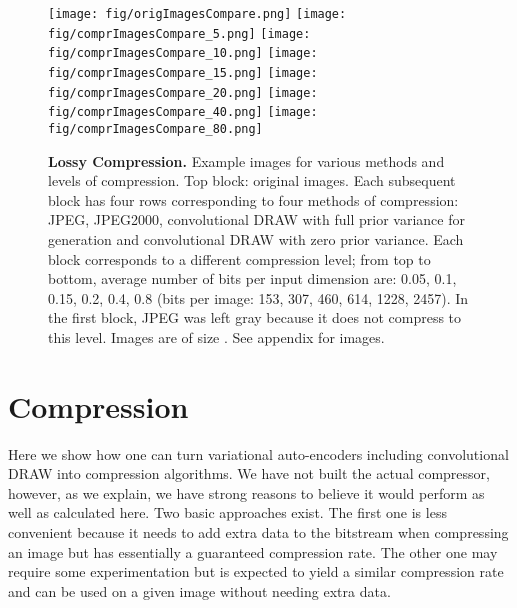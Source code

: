 \documentclass{article}
\begin{document}
\begin{figure}[h!] \vspace{-.0cm}
\begin{center}
\begin{minipage}{0.5\textwidth}
\texttt{[image: fig/origImagesCompare.png]}
\texttt{[image: fig/comprImagesCompare\_5.png]}
\texttt{[image: fig/comprImagesCompare\_10.png]}
\texttt{[image: fig/comprImagesCompare\_15.png]}
\texttt{[image: fig/comprImagesCompare\_20.png]}
\texttt{[image: fig/comprImagesCompare\_40.png]}
\texttt{[image: fig/comprImagesCompare\_80.png]}
\caption{\textbf{Lossy Compression.}
Example images for various methods and levels of compression. Top block: original images. Each subsequent block has four rows corresponding to four methods of compression: JPEG, JPEG2000, convolutional DRAW with full prior variance for generation and convolutional DRAW with zero prior variance. Each block corresponds to a different compression level; from top to bottom, average number of bits per input dimension are: 0.05, 0.1, 0.15, 0.2, 0.4, 0.8 (bits per image: 153, 307, 460, 614, 1228, 2457). In the first block, JPEG was left gray because it does not compress to this level. Images are of size . See appendix for  images. 
}
\vspace{-0.6cm}
\label{fig:compression}
\end{minipage}
\end{center}
\vspace{-.0cm}
\end{figure}


\section{Compression}

Here we show how one can turn variational auto-encoders including convolutional DRAW into compression algorithms. We have not built the actual compressor, however, as we explain, we have strong reasons to believe it would perform as well as calculated here. Two basic approaches exist. The first one is less convenient because it needs to add extra data to the bitstream when compressing an image but has essentially a guaranteed compression rate. The other one may require some experimentation but is expected to yield a similar compression rate and can be used on a given image without needing extra data.
\end{document}

